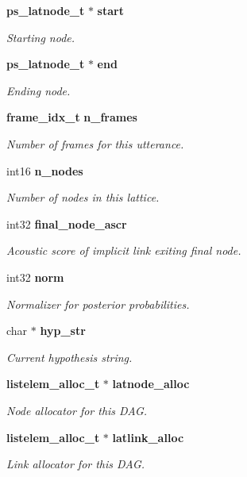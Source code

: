 \begin{DoxyCompactItemize}
{\bf ps\-\_\-latnode\-\_\-t} $\ast$ {\bf start}
\begin{DoxyCompactList}\small\item\em Starting node. \end{DoxyCompactList}\item 
{\bf ps\-\_\-latnode\-\_\-t} $\ast$ {\bf end}
\begin{DoxyCompactList}\small\item\em Ending node. \end{DoxyCompactList}\item 
{\bf frame\-\_\-idx\-\_\-t} {\bf n\-\_\-frames}
\begin{DoxyCompactList}\small\item\em Number of frames for this utterance. \end{DoxyCompactList}\item 
int16 {\bf n\-\_\-nodes}
\begin{DoxyCompactList}\small\item\em Number of nodes in this lattice. \end{DoxyCompactList}\item 
int32 {\bf final\-\_\-node\-\_\-ascr}
\begin{DoxyCompactList}\small\item\em Acoustic score of implicit link exiting final node. \end{DoxyCompactList}\item 
int32 {\bf norm}
\begin{DoxyCompactList}\small\item\em Normalizer for posterior probabilities. \end{DoxyCompactList}\item 
char $\ast$ {\bf hyp\-\_\-str}
\begin{DoxyCompactList}\small\item\em Current hypothesis string. \end{DoxyCompactList}\item 
{\bf listelem\-\_\-alloc\-\_\-t} $\ast$ {\bf latnode\-\_\-alloc}
\begin{DoxyCompactList}\small\item\em Node allocator for this D\-A\-G. \end{DoxyCompactList}\item 
{\bf listelem\-\_\-alloc\-\_\-t} $\ast$ {\bf latlink\-\_\-alloc}
\begin{DoxyCompactList}\small\item\em Link allocator for this D\-A\-G. \end{DoxyCompactList}\item 

\end{DoxyCompactItemize}
